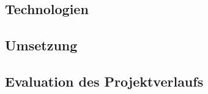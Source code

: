 \begin{spacing}{1}
	\chapter{Technologien}\label{chapter:tech}
\end{spacing}


\begin{spacing}{1}
	\chapter{Umsetzung}\label{chapter:implementation}
\end{spacing}


\begin{spacing}{1}
	\chapter{Evaluation des Projektverlaufs} %
\end{spacing}


\newpage
\thispagestyle{plain}
\setcounter{page}{\value{RPages}}

\glsnogroupskiptrue
\printglossary[title=Glossar,toctitle=Glossar] %
\listoffigures
\lstlistoflistings
% 


